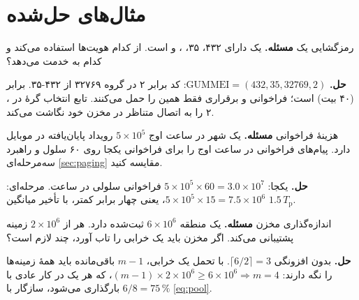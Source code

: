\documentclass[11pt,a4paper]{article}
\begin{document}
\section{مثال‌های حل‌شده}

\begin{examplebox}{رمزگشایی یک }\label{ex:guti}
\textbf{مسئله.} یک  دارای  ۴۳۲،  ۳۵،  ، 
 و   است.  از کدام هویت‌ها استفاده می‌کند و کدام  به
 خدمت می‌دهد؟

\textbf{حل.} $\mathrm{GUMMEI} = (432, 35, 32769, 2)$: کد  برابر ۲ در گروه ۳۲۷۶۹ از  ۴۳۲-۳۵. 
برابر  (۴۰ بیت) است؛ فراخوانی و برقراری  فقط همین را حمل می‌کنند. تابع انتخاب گرهٔ
 در ،  ۲ را به اتصال  متناظر در مخزن خود نگاشت می‌کند.
\end{examplebox}

\begin{examplebox}{هزینهٔ فراخوانی}\label{ex:paging}
\textbf{مسئله.} یک شهر در ساعت اوج $5\times10^5$ رویداد پایان‌یافته در موبایل دارد. پیام‌های فراخوانی در ساعت اوج را برای
فراخوانی یکجا روی ۶۰ سلول و راهبرد سه‌مرحله‌ای \cref{sec:paging} مقایسه کنید.

\textbf{حل.} یکجا: $5\times10^5\times60 = 3.0\times10^7$ فراخوانی سلولی در ساعت. مرحله‌ای: $5\times10^5\times15 = 7.5\times10^6$،
یعنی چهار برابر کمتر، با تأخیر میانگین $1.5\,T_\mathrm{p}$.
\end{examplebox}

\begin{examplebox}{اندازه‌گذاری مخزن}\label{ex:pool}
\textbf{مسئله.} یک منطقه $6\times10^6$  ثبت‌شده دارد. هر  از $2\times10^6$ زمینه پشتیبانی می‌کند. اگر مخزن باید
یک خرابی را تاب آورد، چند  لازم است؟

\textbf{حل.} بدون افزونگی $\lceil 6/2\rceil = 3$. با تحمل یک خرابی، $m-1$  باقی‌مانده باید همهٔ زمینه‌ها را نگه دارند:
$(m-1)\times2\times10^6 \ge 6\times10^6 \Rightarrow m = 4$، که هر یک در کار عادی با $6/8 = 75\,\%$ بارگذاری می‌شود، سازگار
با \cref{eq:pool}.
\end{examplebox}

\end{document}
